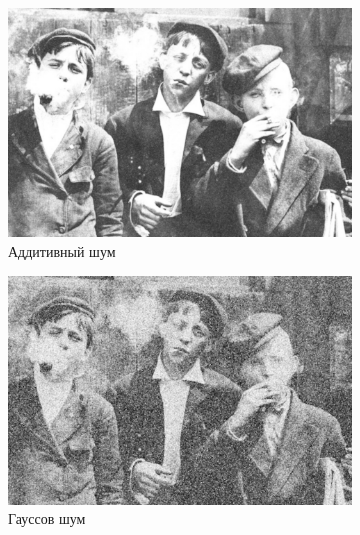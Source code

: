 \begin{figure}[ht!]
\begin{subfigure}[b]{0.5\linewidth}
      \includegraphics[width=0.95\linewidth]{../Contraharmonic_Filter/Contraharmonic_Additive_noise_(m,n=(3,_3),q=0.85).jpg} 
      \caption{Аддитивный шум} 
      \label{contraharmonic_0.85:c} 
      \vspace{4ex}
    \end{subfigure}%
    \begin{subfigure}[b]{0.5\linewidth}
      \centering
      \includegraphics[width=0.95\linewidth]{../Contraharmonic_Filter/Contraharmonic_Gaussian_noise_(m,n=(3,_3),q=0.85).jpg} 
      \caption{Гауссов шум} 
      \label{contraharmonic_0.85:d} 
      \vspace{4ex}
    \end{subfigure}
    \begin{subfigure}[b]{0.5\linewidth}
      \centering

\end{subfigure}
\end{figure}
